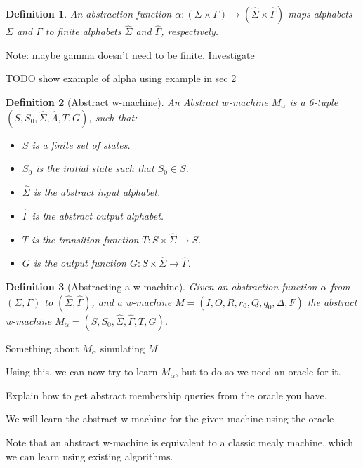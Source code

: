 \documentclass{article}
\newtheorem{definition}{Definition}
\begin{document}
\begin{definition}
An abstraction function $\alpha : (\Sigma \times \Gamma) \to (\hat\Sigma \times \hat\Gamma)$ maps alphabets $\Sigma$ and $\Gamma$ to finite alphabets $\hat\Sigma$ and $\hat\Gamma$, respectively.
\end{definition}
Note: maybe gamma doesn't need to be finite. Investigate

\begin{example}
TODO show example of alpha using example in sec 2
\end{example}

\begin{definition}[Abstract w-machine]
An Abstract $w$-machine $M_\alpha$ is a 6-tuple $(S, S_0, \hat\Sigma, \hat\Lambda, T, G)$, such that:
\begin{itemize}
    \item $S$ is a finite set of states. 
    \item $S_0$ is the initial state such that $S_0 \in S$.
    \item $\hat\Sigma$ is the abstract input alphabet. 
    \item $\hat\Gamma$ is the abstract output alphabet.
    \item $T$ is the transition function $T \colon S \times \hat\Sigma \to S$.
    \item $G$ is the output function $G \colon S \times \hat\Sigma \to \hat\Gamma$.
\end{itemize}
\end{definition}

\begin{definition}[Abstracting a w-machine]
Given an abstraction function $\alpha$ from $(\Sigma,\Gamma)$ to $(\hat\Sigma,\hat\Gamma)$,
and a w-machine $M=(I, O, R, r_0, Q, q_0, \Delta, F)$
the abstract w-machine $M_\alpha=(S, S_0, \hat\Sigma, \hat\Gamma, T, G)$.
\end{definition}

Something about $M_\alpha$ simulating $M$.

Using this, we can now try to learn $M_\alpha$, but to do so we need an oracle for it.

Explain how to get abstract membership queries from the oracle you have.
\begin{theorem}
We will  learn the abstract w-machine for the given machine using the oracle
\end{theorem}


Note that an abstract w-machine is equivalent to a classic mealy machine, which we can learn using existing algorithms.
\end{document}
